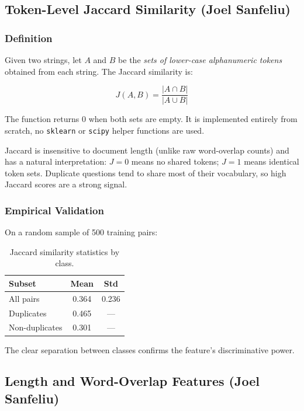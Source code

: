 \documentclass[11pt,a4paper]{article}
\begin{document}
\subsection{Token-Level Jaccard Similarity \textnormal{(Joel Sanfeliu)}}

\subsubsection{Definition}

Given two strings, let $A$ and $B$ be the \emph{sets of lower-case alphanumeric tokens} obtained from each string. The Jaccard similarity is:

\[
    J(A,B) = \frac{|A \cap B|}{|A \cup B|}
\]

The function returns 0 when both sets are empty. It is implemented entirely from scratch, no \texttt{sklearn} or \texttt{scipy} helper functions are used.


Jaccard is insensitive to document length (unlike raw word-overlap counts) and has a natural interpretation: $J=0$ means no shared tokens; $J=1$ means identical token sets. Duplicate questions tend to share most of their vocabulary, so high Jaccard scores are a strong signal.

\subsubsection{Empirical Validation}

On a random sample of 500 training pairs:

\begin{table}[h]
\centering
\caption{Jaccard similarity statistics by class.}
\begin{tabular}{lcc}
\toprule
\textbf{Subset} & \textbf{Mean} & \textbf{Std} \\
\midrule
All pairs       & 0.364 & 0.236 \\
Duplicates      & 0.465 & ---   \\
Non-duplicates  & 0.301 & ---   \\
\bottomrule
\end{tabular}
\end{table}

The clear separation between classes confirms the feature's discriminative power.

\subsection{Length and Word-Overlap Features \textnormal{(Joel Sanfeliu)}}
\end{document}
